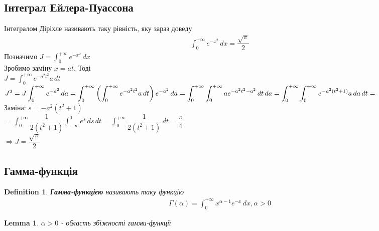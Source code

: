 \documentclass[a4paper, 10pt]{article}
\def\huge{\displaystyle}
\theoremstyle{theoremdd}
\theoremstyle{theoremdd}
\newtheorem{definition}[theorem]{Definition}
\theoremstyle{theoremdd}
\theoremstyle{theoremdd}
\theoremstyle{theoremdd}
\theoremstyle{theoremdd}
\theoremstyle{theoremdd}
\newtheorem{lemma}[theorem]{Lemma}
\theoremstyle{theoremdd}
\begin{document}
\subsection{Інтеграл Ейлера-Пуассона}
Інтегралом Діріхле називають таку рівність, яку зараз доведу
\begin{align*}
\int_0^{+\infty} e^{-x^2}\,dx = \dfrac{\sqrt{\pi}}{2}
\end{align*}
Позначимо $J = \huge \int_0^{+\infty} e^{-x^2}\,dx$\\
Зробимо заміну $x = at$. Тоді\\
$J = \huge \int_0^{+\infty} e^{-a^2 t^2}a \,dt$\\
$J^2 = \huge J \int_0^{+\infty} e^{-a^2}\,da = \int_0^{+\infty} \left( \int_0^{+\infty} e^{-a^2 t^2} a\,dt \right) e^{-a^2}\,da = \int_0^{+\infty} \int_0^{+\infty} ae^{-a^2t^2-a^2}\,dt\,da \\ = \int_0^{+\infty} \int_0^{+\infty} e^{-a^2(t^2+1)} a\,da \,dt =$\\
Заміна: $s = -a^2(t^2+1)$\\
$= \huge \int_0^{+\infty} \dfrac{1}{2(t^2+1)} \int_{-\infty}^0 e^s\,ds\,dt = \int_0^{+\infty} \dfrac{1}{2(t^2+1)}\,dt = \dfrac{\pi}{4}$\\
$\Rightarrow J = \dfrac{\sqrt{\pi}}{2}$

\subsection{Гамма-функція}
\begin{definition}
\textbf{Гамма-функцією} називають таку функцію
\begin{align*}
\Gamma(\alpha) = \huge \int_0^{+\infty} x^{\alpha-1}e^{-x}\,dx, \alpha > 0
\end{align*}
\end{definition}

\begin{lemma}
$\alpha > 0$ - область збіжності гамми-функції
\end{lemma}
\end{document}
